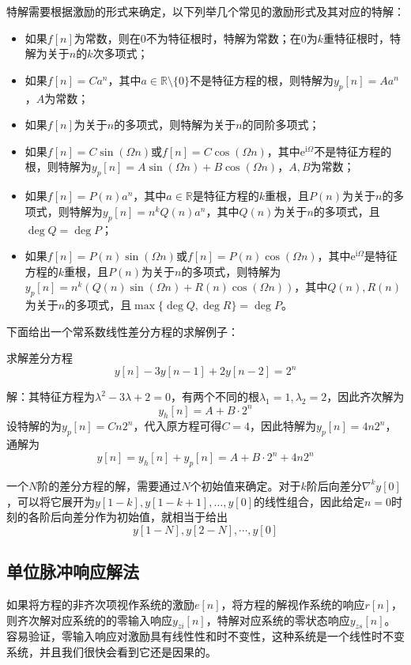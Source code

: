 \documentclass{ctexbook}
\begin{document}
特解需要根据激励的形式来确定，以下列举几个常见的激励形式及其对应的特解：
\begin{itemize}
    \item 如果$f[n]$为常数，则在$0$不为特征根时，特解为常数；在$0$为$k$重特征根时，特解为关于$n$的$k$次多项式；
    \item 如果$f[n]=Ca^n$，其中$a\in\mathbb{R}\setminus \{0\}$不是特征方程的根，则特解为$y_p[n]=Aa^n$，$A$为常数；
    \item 如果$f[n]$为关于$n$的多项式，则特解为关于$n$的同阶多项式；
    \item 如果$f[n]=C\sin(\Omega n)$或$f[n]=C\cos(\Omega n)$，其中$\mathrm{e}^{\mathrm{i}\Omega}$不是特征方程的根，则特解为$y_p[n]=A\sin(\Omega n)+B\cos(\Omega n)$，$A,B$为常数；
    \item 如果$f[n]=P(n)a^n$，其中$a\in\mathbb{R}$是特征方程的$k$重根，且$P(n)$为关于$n$的多项式，则特解为$y_p[n]=n^k Q(n)a^n$，其中$Q(n)$为关于$n$的多项式，且$\deg Q=\deg P$；
    \item 如果$f[n]=P(n)\sin(\Omega n)$或$f[n]=P(n)\cos(\Omega n)$，其中$\mathrm{e}^{\mathrm{i}\Omega}$是特征方程的$k$重根，且$P(n)$为关于$n$的多项式，则特解为$y_p[n]=n^k(Q(n)\sin(\Omega n)+R(n)\cos(\Omega n))$，其中$Q(n),R(n)$为关于$n$的多项式，且$\max\{\deg Q,\deg R\}=\deg P$。
\end{itemize}

下面给出一个常系数线性差分方程的求解例子：
\begin{example}
    求解差分方程
    $$y[n]-3y[n-1]+2y[n-2]=2^n$$

    解：其特征方程为$\lambda^2-3\lambda+2=0$，有两个不同的根$\lambda_1=1,\lambda_2=2$，因此齐次解为
    $$y_h[n]=A+B\cdot 2^n$$
    设特解的为$y_p[n]=C n 2^n$，代入原方程可得$C=4$，因此特解为$y_p[n]=4 n 2^n$，通解为
    \[y[n]=y_h[n]+y_p[n]=A+B\cdot 2^n+4 n 2^n\]
\end{example}

一个$N$阶的差分方程的解，需要通过$N$个初始值来确定。对于$k$阶后向差分$\nabla^k y[0]$，可以将它展开为$y[1-k],y[1-k+1],\dots,y[0]$的线性组合，因此给定$n=0$时刻的各阶后向差分作为初始值，就相当于给出
$$y[1-N],y[2-N],\cdots,y[0]$$

\subsection{单位脉冲响应解法}\label{sub:h_solution}

如果将方程的非齐次项视作系统的激励$e[n]$，将方程的解视作系统的响应$r[n]$，则齐次解对应系统的的零输入响应$y_{zi}[n]$，特解对应系统的零状态响应$y_{zs}[n]$。容易验证，零输入响应对激励具有线性性和时不变性，这种系统是一个线性时不变系统，并且我们很快会看到它还是因果的。
\end{document}

